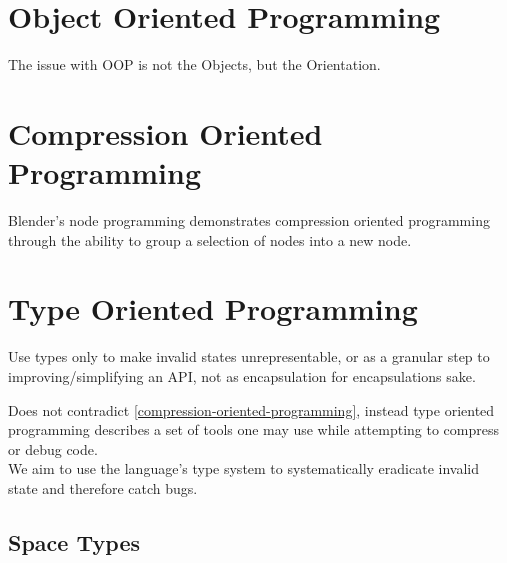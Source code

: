 \documentclass{article}
\begin{document}
\cite{augmentating-human-intellect}
\cite{mother-of-all-demos}
\cite{augmentation-of-douglas-engelbart}
\cite{written-for-eyes}
\cite{the-future-of-programming}
\cite{a-few-words-on-doug-engelbart}
\cite{inventing-on-principle}

\section[object-oriented-programming]{Object Oriented Programming}

The issue with OOP is not the Objects, but the Orientation.

\section[compression-oriented-programming]{Compression Oriented Programming}

\cite{designing-and-evaluating-reusable-components}
\cite{immediate-mode-gui}
\cite{five-second-stall}
\cite{semantic-compression}
\cite{complexity-and-granularity}
\cite{thirty-million-line-problem}
\cite{twitter-and-visual-studio-rant}
\cite{how-fast-should-an-unoptimised-terminal-run}
\cite{simple-code-high-performance}
\cite{where-does-bad-code-come-from}
\cite{the-only-unbreakable-law}

Blender's node programming demonstrates compression oriented programming
through the ability to group a selection of nodes into a new node.

\section[type-oriented-programming]{Type Oriented Programming}

Use types only to make invalid states unrepresentable,
or as a granular\cite{complexity-and-granularity} step to
improving/simplifying an API,
not as encapsulation for encapsulations sake.

Does not contradict \ref{compression-oriented-programming},
instead type oriented programming describes a set of tools one may use while
attempting to compress or debug code. \\
We aim to use the language's type system to systematically eradicate invalid
state and therefore catch bugs.

\subsection[space-types]{Space Types}
\end{document}
